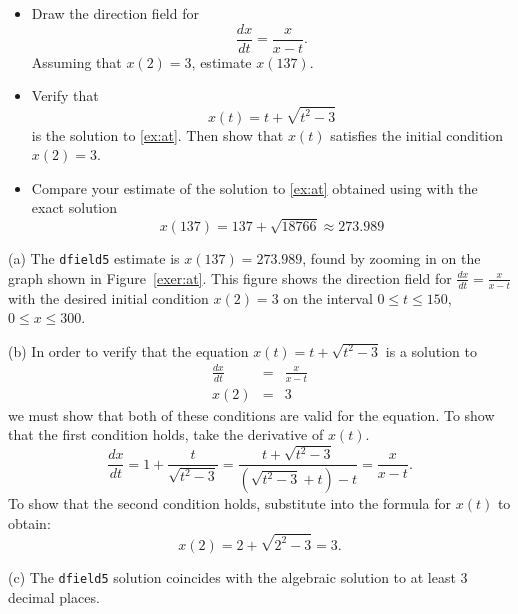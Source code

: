 \documentclass{ximera}
\begin{document}
\begin{exercise}  \label{exer:at}
\begin{itemize}
\item[(a)]  Draw the direction field for
\begin{equation} \label{ex:at}
\frac{dx}{dt} = \frac{x}{x-t}.
\end{equation}
Assuming that $x(2)=3$, estimate $x(137)$.
\item[(b)]  Verify that
\[
x(t) = t + \sqrt{t^2-3}
\]
is the solution to \eqref{ex:at}.  Then show that $x(t)$ satisfies the
initial condition $x(2)=3$.
\item[(c)]  Compare your estimate of the solution to \eqref{ex:at}
obtained using {\dfield} with the exact solution
\[
x(137)= 137 +\sqrt{18766} \approx 273.989
\]
\end{itemize}

\begin{solution}

(a) The {\tt dfield5} estimate is $x(137) = 273.989$, found by zooming
in on the graph shown in Figure~\ref{exer:at}.  This figure shows the
direction field for $\frac{dx}{dt} = \frac{x}{x - t}$ with the desired
initial condition $x(2) = 3$ on the interval $0 \leq t \leq 150$, $0
\leq x \leq 300$.

(b) In order to verify that the equation $x(t) = t + \sqrt{t^2 - 3}$
is a solution to
\[
\begin{array}{rcl}
\frac{dx}{dt} & = & \frac{x}{x - t} \\
x(2) & = & 3\end{array}
\]
we must show that both of these conditions are valid for the equation.
To show that the first condition holds, take the derivative of $x(t)$.
\[
\frac{dx}{dt} = 1 + \frac{t}{\sqrt{t^2 - 3}} = \frac{t + {\sqrt{t^2 - 
3}}}{\left({\sqrt{t^2 - 3}} + t\right) - t} = \frac{x}{x - t}.
\]
To show that the second condition holds, substitute into the formula for
$x(t)$ to obtain:
\[ x(2) = 2 + \sqrt{2^2 - 3} = 3. \]

(c) The {\tt dfield5} solution coincides with the algebraic solution to at
least 3 decimal places.

\begin{figure}[htb]
                       \centerline{%
                       }
\end{figure}




\end{solution}
\end{exercise}
\end{document}
